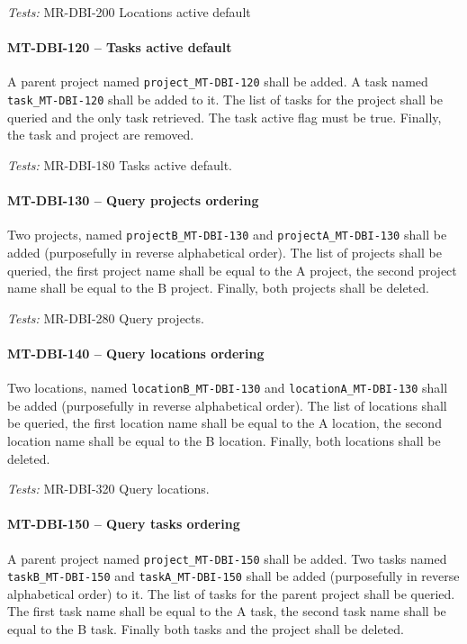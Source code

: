 \textit{Tests: } MR-DBI-200 Locations active default

\paragraph{MT-DBI-120 -- Tasks active default}
A parent project named \lstinline{project_MT-DBI-120} shall
be added. A task named \lstinline{task_MT-DBI-120} shall be added
to it.
The list of tasks for the project shall be queried and the only
task retrieved. The task active flag must be true.
Finally, the task and project are removed.

\textit{Tests: } MR-DBI-180 Tasks active default.

\paragraph{MT-DBI-130 -- Query projects ordering}
Two projects, named \lstinline{projectB_MT-DBI-130}
and \lstinline{projectA_MT-DBI-130} shall be added
(purposefully in reverse alphabetical order).
The list of projects shall be queried, the first
project name shall be equal to the A project,
the second project name shall be equal to the B project.
Finally, both projects shall be deleted.

\textit{Tests: } MR-DBI-280 Query projects.

\paragraph{MT-DBI-140 -- Query locations ordering}
Two locations, named \lstinline{locationB_MT-DBI-130}
and \lstinline{locationA_MT-DBI-130} shall be added
(purposefully in reverse alphabetical order).
The list of locations shall be queried, the first
location name shall be equal to the A location,
the second location name shall be equal to the B location.
Finally, both locations shall be deleted.

\textit{Tests: } MR-DBI-320 Query locations.

\paragraph{MT-DBI-150 -- Query tasks ordering}
A parent project named \lstinline{project_MT-DBI-150}
shall be added.
Two tasks named \lstinline{taskB_MT-DBI-150} and \lstinline{taskA_MT-DBI-150}
shall be added (purposefully in reverse alphabetical order) to it.
The list of tasks for the parent project shall be queried.
The first task name shall be equal to the A task, the second task name
shall be equal to the B task.
Finally both tasks and the project shall be deleted.

